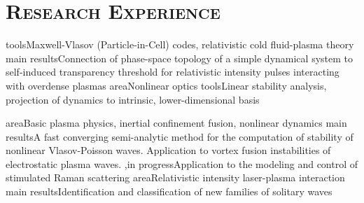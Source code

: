 \documentclass[11pt,a4paper,final]{moderncv}
\begin{document}
\section{\textsc{Research Experience}}
			 {}{}{}{} 
 		{tools}{Maxwell-Vlasov (Particle-in-Cell) codes, relativistic cold fluid-plasma theory}
 		{main results}{Connection of phase-space topology of a simple dynamical system to self-induced transparency threshold for
				relativistic intensity pulses interacting with overdense plasmas
 				}
		{area}{Nonlinear optics}
		{tools}{Linear stability analysis, projection of dynamics to intrinsic, lower-dimensional basis}


		{area}{Basic plasma physics, inertial confinement fusion, nonlinear dynamics}
		{main results}{A fast converging semi-analytic method for the computation of stability of nonlinear {Vlasov-Poisson} waves.
				Application to vortex fusion instabilities of electrostatic plasma waves.}
		{\sep in progress}{Application to the modeling and control of stimulated Raman scattering}
		{area}{Relativistic intensity laser-plasma interaction}
		{main results}{Identification and classification of new families of solitary waves}{}{}
\end{document}
